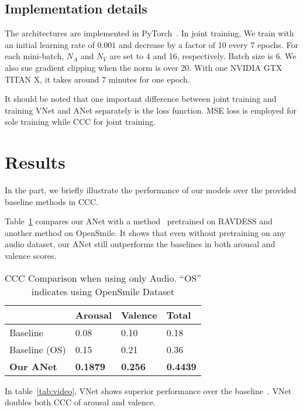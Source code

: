 \documentclass[a4paper, 10pt, conference]{ieeeconf}      %
\begin{document}
\subsection{Implementation details}
The architectures are implemented in PyTorch~\cite{paszke2017automatic}. 
In joint training, We train with an initial learning rate of $0.001$ and decrease by a factor of 10 every 7 epochs. For each mini-batch, $N_A$ and $N_V$ are set to 4 and 16, respectively. Batch size is 6.
We also sue gradient clipping when the norm is over 20.
With one NVIDIA GTX TITAN X, it takes around 7 minutes for one epoch.

It should be noted that one important difference between joint training and training VNet and ANet separately is the loss function. MSE loss is employed for sole training while CCC for joint training.



\section{Results}
\label{sec:result}
In the part, we briefly illustrate the performance of our models over the provided baseline methods in CCC.

Table~\ref{tab:audio} compares our ANet with a method~\cite{barros2016developing} pretrained on RAVDESS and another method on OpenSmile. It shows that even without pretraining on any audio dataset, our ANet still outperforms the baselines in both arousal and valence scores.

\begin{table}[!ht]
\centering
\caption{CCC Comparison when using only Audio. ``OS'' indicates using OpenSmile Dataset}
\label{tab:audio}
\begin{tabular}{l|l|l|l}
\hline
                           & Arousal & Valence & Total  \\ \hline\hline
Baseline~\cite{barros2016developing}        & 0.08    & 0.10    & 0.18   \\ \hline
Baseline (OS) & 0.15    & 0.21    & 0.36   \\ \hline
\textbf{Our ANet}   & \textbf{0.1879}  & \textbf{0.256}   & \textbf{0.4439} \\ \hline
\end{tabular}
\end{table}

In table~\ref{tab:video}, VNet shows superior performance over the baseline~\cite{barros2016developing}. VNet doubles both CCC of arousal and valence.
\end{document}
